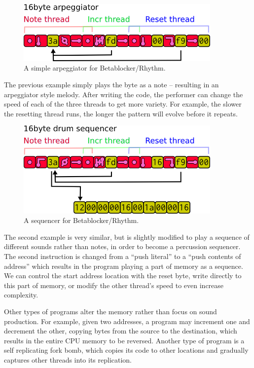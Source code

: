 \documentclass[letterpaper, 12pt]{article}
\begin{document}
\begin{figure}[H]
	\centering
		\includegraphics[width=10cm]{bbds-arp}
	\caption{A simple arpeggiator for Betablocker/Rhythm.}
	\label{fig:fig_bbds-arp}
\end{figure}

The previous example simply plays the byte as a note -- resulting in an arpeggiator style melody. After writing the code, the performer can change the speed of each of the three threads to get more variety. For example, the slower the resetting thread runs, the longer the pattern will evolve before it repeats.

\begin{figure}[H]
	\centering
		\includegraphics[width=10cm]{bbds-seq}
	\caption{A sequencer for Betablocker/Rhythm.}
	\label{fig:fig_bbds-seq}
\end{figure}

The second example is very similar, but is slightly modified to play a sequence of different sounds rather than notes, in order to become a percussion sequencer. The second instruction is changed from a ``push literal'' to a ``push contents of address'' which results in the program playing a part of memory as a sequence. We can control the start address location with the reset byte, write directly to this part of memory, or modify the other thread's speed to even increase complexity.

Other types of programs alter the memory rather than focus on sound production.
For example, given two addresses, a program may increment one and decrement the other, copying bytes from the source to the destination, which results in the entire CPU memory to be reversed.
Another type of program is a self replicating fork bomb, which copies its code to other locations and gradually captures other threads into its replication.
\parskip 18pt
\end{document}
